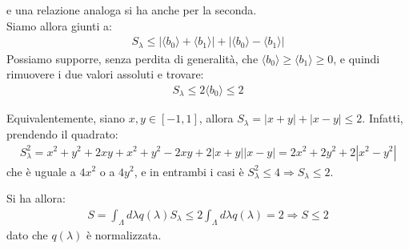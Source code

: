 \documentclass[../../InformazioneQuantistica.tex]{subfiles}
\begin{document}
e una relazione analoga si ha anche per la seconda.\\
Siamo allora giunti a:
\begin{align*}
S_\lambda \leq |\langle b_0 \rangle + \langle b_1 \rangle| + |\langle b_0 \rangle - \langle b_1 \rangle|
\end{align*}
Possiamo supporre, senza perdita di generalità, che $\langle b_0 \rangle \geq \langle b_1 \rangle \geq 0$, e quindi rimuovere i due valori assoluti e trovare:
\begin{align*}
S_\lambda \leq 2\langle b_0\rangle \leq 2
\end{align*}

\begin{expl}
Equivalentemente, siano $x,y\in [-1,1]$, allora $S_\lambda=|x+y|+|x-y|\leq 2$. Infatti, prendendo il quadrato:
\begin{align*}
S^2_\lambda = x^2 + y^2 +2xy +x^2+y^2 -2xy + 2|x+y||x-y| = 2x^2 +2y^2 +2|x^2-y^2|
\end{align*}
che è uguale a $4x^2$ o a $4y^2$, e in entrambi i casi è $S^2_\lambda\leq 4\Rightarrow S_\lambda\leq 2$.
\end{expl}
Si ha allora:
\begin{align*}
S = \int_\Lambda d\lambda q(\lambda) S_\lambda \leq 2\int_\Lambda d\lambda q(\lambda) = 2\Rightarrow S\leq 2
\end{align*}
dato che $q(\lambda)$ è normalizzata.\\
\end{document}
